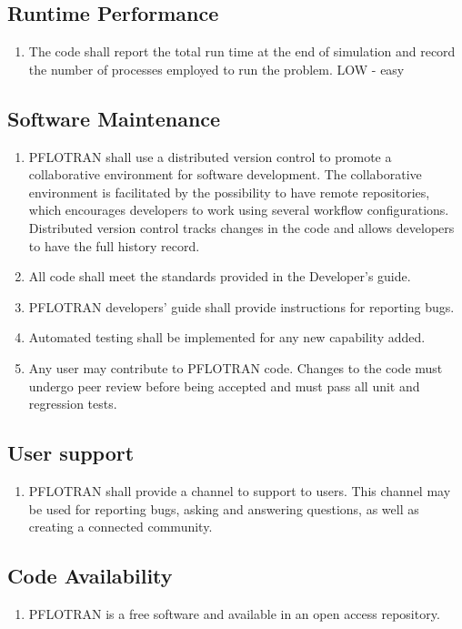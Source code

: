 \subsection{Runtime Performance}
\begin{enumerate}[label=NFR \arabic*.,ref=NFR \arabic*,nosep]
	\item The code shall report the total run time at the end of simulation and record the number of processes employed to run the problem. LOW - easy
\end{enumerate}

\subsection{Software Maintenance}
\begin{enumerate}[label=NFR \arabic*.,ref=NFR \arabic*,nosep, resume]
	\item PFLOTRAN shall use a distributed version control to promote a collaborative environment for software development. The collaborative environment is facilitated by the possibility to have remote repositories, which encourages developers to work using several workflow configurations. Distributed version control tracks changes in the code and allows developers to have the full history record.\label{versionControl}
	\item All code shall meet the standards provided in the Developer’s guide. \label{codeStandard}
	\item PFLOTRAN developers’ guide shall provide instructions for reporting bugs.\label{reportBugs}
	\item Automated testing shall be implemented for any new capability added.\label{autTesting}
	\item Any user may contribute to PFLOTRAN code. Changes to the code must undergo peer review before being accepted and must pass all unit and regression tests.\label{contribution}
\end{enumerate}

\subsection{User support}
\begin{enumerate}[label=NFR \arabic*.,ref=NFR \arabic*,nosep, resume]
	\item PFLOTRAN shall provide a channel to support to users. This channel may be used for reporting bugs, asking and answering questions, as well as creating a connected community.\label{userSupport}
\end{enumerate}

\subsection{Code Availability}
\begin{enumerate}[label=NFR \arabic*.,ref=NFR \arabic*,nosep, resume]
	\item PFLOTRAN is a free software and available in an open access repository.\label{codeAvail}
\end{enumerate}




















